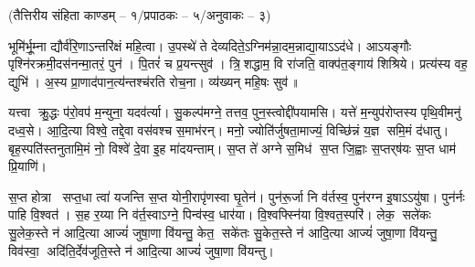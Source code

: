 \vspace{-1ex}
\centerline{\normalsize (तैत्तिरीय संहिता काण्डम् – १/प्रपाठकः – ५/अनुवाकः – ३)}

भूमि॑र्भू॒म्ना द्यौर्व॑रि॒णाऽन्तरि॑क्षं महि॒त्वा। उ॒पस्थे॑ ते देव्यदिते॒ऽग्नि\-म॑न्ना॒दम॒न्नाद्या॒याऽऽद॑धे।
आऽयङ्गौः पृश्नि॑रक्रमी॒\-दस॑नन्मा॒तरं॒ पुन॑। पि॒तरं॑ च प्र॒यन्त्सुव॑।
त्रि॒शद्धाम॒ वि रा॑जति॒ वाक्प॑त॒ङ्गाय॑ शिश्रिये। प्रत्य॑स्य वह॒ द्युभि॑। अ॒स्य प्रा॒णाद॑पान॒त्य॑न्तश्च॑रति रोच॒ना।
व्य॑ख्यन् महि॒षः सुव॑॥

यत्त्वा क्रु॒द्धः प॑रो॒वप॑ म॒न्युना॒ यदव॑र्त्या। सु॒कल्प॑मग्ने॒ तत्तव॒ पुन॒स्त्वोद्दी॑पयामसि।
यत्ते॑ म॒न्युप॑रोप्तस्य पृथि॒वीमनु॑ दध्व॒से। आ॒दि॒त्या विश्वे॒ तद्दे॒वा वस॑वश्च स॒माभ॑रन्।
मनो॒ ज्योति॑र्जुषता॒माज्यं॒ विच्छि॑न्नं य॒ज्ञ समि॒मं द॑धातु। बृह॒स्पति॑स्तनुतामि॒मं नो॒ विश्वे॑ दे॒वा इ॒ह मा॑दयन्ताम्।
 स॒प्त ते॑ अग्ने स॒मिध॑ स॒प्त जि॒ह्वाः स॒प्तर्‌ष॑यः स॒प्त धाम॑ प्रि॒याणि॑। 

स॒प्त होत्रा सप्त॒धा त्वा॑ यजन्ति स॒प्त योनी॒रापृ॑णस्वा घृ॒तेन॑। पुन॑रू॒र्जा नि व॑र्तस्व॒ पुन॑रग्न इ॒षाऽऽयु॑षा। पुन॑र्नः पाहि वि॒श्वत॑। स॒ह र॒य्या नि व॑र्त॒स्वाऽग्ने॒ पिन्व॑स्व॒ धार॑या। वि॒श्वफ्स्नि॑या वि॒श्वत॒स्परि॑। लेक॒ सले॑कः सु॒लेक॒स्ते न॑ आदि॒त्या आज्यं॑ जुषा॒णा वि॑यन्तु॒ केत॒ सके॑तः सु॒केत॒स्ते न॑ आदि॒त्या आज्यं॑ जुषा॒णा वि॑यन्तु॒ विव॑स्वा॒ अदि॑ति॒र्देव॑जूति॒स्ते न॑ आदि॒त्या आज्यं॑ जुषा॒णा वि॑यन्तु।

